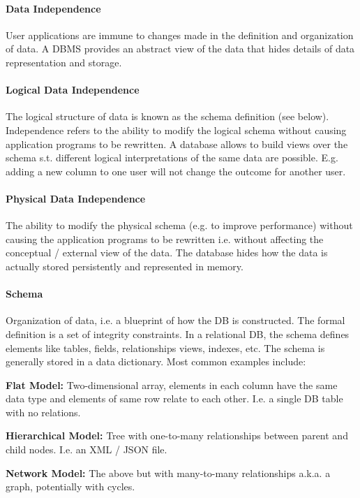 \paragraph{Data Independence}
User applications are immune to changes made in the definition and organization of data. A DBMS provides an abstract view of the data that hides details of data representation and storage.

\paragraph{Logical Data Independence}
The logical structure of data is known as the schema definition (see below). Independence refers to the ability to modify the logical schema without causing application programs to be rewritten. A database allows to build views over the schema s.t. different logical interpretations of the same data are possible. E.g. adding a new column to one user will not change the outcome for another user.

\paragraph{Physical Data Independence}
The ability to modify the physical schema (e.g. to improve performance) without causing the application programs to be rewritten i.e. without affecting the conceptual / external view of the data. The database hides how the data is actually stored persistently and represented in memory.

\paragraph{Schema}
Organization of data, i.e. a blueprint of how the DB is constructed. The formal definition is a set of integrity constraints. In a relational DB, the schema defines elements like tables, fields, relationships views, indexes, etc. The schema is generally stored in a data dictionary. Most common examples include:

\textbf{Flat Model:} Two-dimensional array, elements in each column have the same data type and elements of same row relate to each other. I.e. a single DB table with no relations.

\textbf{Hierarchical Model:} Tree with one-to-many relationships between parent and child nodes. I.e. an XML / JSON file.

\textbf{Network Model:} The above but with many-to-many relationships a.k.a. a graph, potentially with cycles.

